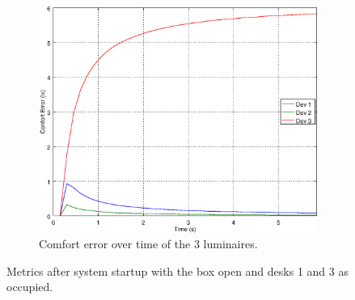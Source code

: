 \begin{figure}[ht]
\begin{subfigure}[t]{0.3\textwidth}
    \centering
    \includegraphics[width=.95\textwidth]{img/n_open_o101}
    \caption{Comfort error over time of the 3 luminaires.}
    \label{fig:n_open_o101}
    \end{subfigure}
    \caption{Metrics after system startup with the box open and desks 1 and 3 as occupied.}
\end{figure}



